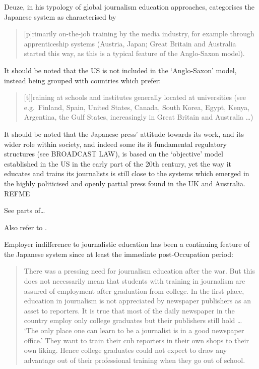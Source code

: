 \documentclass[11pt, headings=normal]{scrartcl}
\begin{document}
Deuze, in his typology of global journalism education approaches,
categorises the Japanese system as characterised by

\begin{quote}
{[}p{]}rimarily on-the-job training by the media industry, for example
through apprenticeship systems (Austria, Japan; Great Britain and
Australia started this way, as this is a typical feature of the
Anglo-Saxon model).\autocite[ p22]{Deuze:2006}
\end{quote}

It should be noted that the US is not included in the `Anglo-Saxon'
model, instead being grouped with countries which prefer:

\begin{quote}
{[}t{]}{]}raining at schools and institutes generally located at
universities (see e.g.~Finland, Spain, United States, Canada, South
Korea, Egypt, Kenya, Argentina, the Gulf States, increasingly in Great
Britain and Australia \ldots{})
\end{quote}

It should be noted that the Japanese press' attitude towards its work,
and its wider role within society, and indeed some its it fundamental
regulatory structures (see BROADCAST LAW), is based on the `objective'
model established in the US in the early part of the 20th century, yet
the way it educates and trains its journalists is still close to the
systems which emerged in the highly politicised and openly partial press
found in the UK and Australia. {REFME}

See parts of\ldots{}

\autocites{Cooper-Chen:1997a}{Fujita:2004}{Hanada:2003}{Hashimoto:2003a}{Ikuta:2004}{IwabuchiY:2004}{Tsukamoto:1993}{Tsukamoto:2006}

Also refer to \textcite{Aldridge:2003}.

Employer indifference to journalistic education has been a continuing
feature of the Japanese system since at least the immediate
post-Occupation period:

\begin{quote}
There was a pressing need for journalism education after the war. But
this does not necessarily mean that students with training in journalism
are assured of employment after graduation from college. In the first
place, education in journalism is not appreciated by newspaper
publishers as an asset to reporters. It is true that most of the daily
newspaper in the country employ only college graduates but their
publishers still hold \ldots{} `The only place one can learn to be a
journalist is in a good newspaper office.' They want to train their cub
reporters in their own shops to their own liking. Hence college
graduates could not expect to draw any advantage out of their
professional training when they go out of school. \autocite[
326]{Chiba:1952}
\end{quote}
\end{document}
